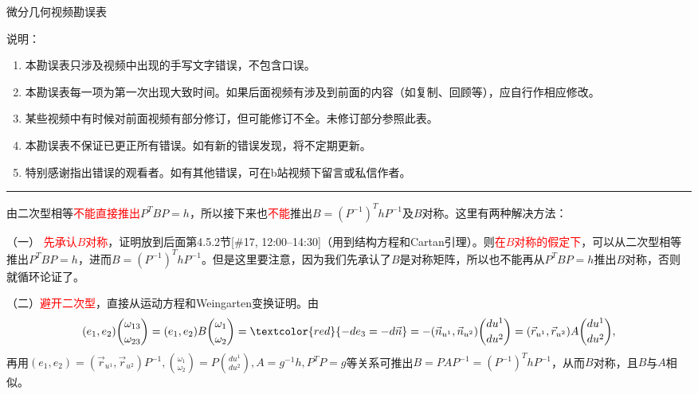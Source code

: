\documentclass{article}
\begin{document}
\begin{center}
	 微分几何视频勘误表
\end{center}
	说明：	
	\begin{enumerate}
		\item 本勘误表只涉及视频中出现的手写文字错误，不包含口误。
		\item 本勘误表每一项为第一次出现大致时间。如果后面视频有涉及到前面的内容（如复制、回顾等），应自行作相应修改。
		\item 某些视频中有时候对前面视频有部分修订，但可能修订不全。未修订部分参照此表。
		\item 本勘误表不保证已更正所有错误。如有新的错误发现，将不定期更新。
		\item 特别感谢指出错误的观看者。如有其他错误，可在b站视频下留言或私信作者。
	\end{enumerate}	
\rule[5pt]{\textwidth}{1pt}

 由二次型相等\textcolor{red}{不能直接推出}$P^{T}BP=h$，所以接下来也\textcolor{red}{不能}推出$B=(P^{-1})^{T}hP^{-1}$及$B$对称。这里有两种解决方法：

（一） \textcolor{red}{先承认$B$对称}，证明放到后面第4.5.2节[\#17, 12:00--14:30]（用到结构方程和Cartan引理）。则\textcolor{red}{在$B$对称的假定下}，可以从二次型相等推出$P^{T}BP=h$，进而$B=(P^{-1})^{T}hP^{-1}$。但是这里要注意，因为我们先承认了$B$是对称矩阵，所以也不能再从$P^{T}BP=h$推出$B$对称，否则就循环论证了。

（二）\textcolor{red}{避开二次型}，直接从运动方程和Weingarten变换证明。由$$(e_1,e_2)\binom{\omega_{13}}{\omega_{23}}=(e_1,e_2)B\binom{\omega_1}{\omega_2}=\textcolor{red}{-de_3=-d\vec{n}}=-(\vec{n}_{u^1},\vec{n}_{u^2})\binom{du^1}{du^2}=(\vec{r}_{u^1},\vec{r}_{u^2})A\binom{du^1}{du^2},$$
再用$(e_1,e_2)=(\vec{r}_{u^1},\vec{r}_{u^2})P^{-1},\binom{\omega_1}{\omega_2}=P\binom{du^1}{du^2},A=g^{-1}h, P^{T}P=g$等关系可推出$B=PAP^{-1}=(P^{-1})^{T}hP^{-1}$，从而$B$对称，且$B$与$A$相似。
	
	

	
	
\end{document}
